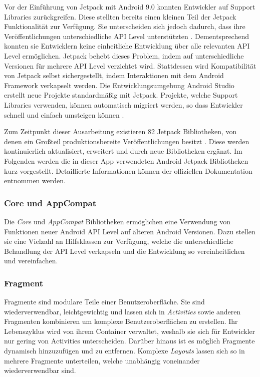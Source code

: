 \documentclass[a4paper, 11pt]{article}
\begin{document}
Vor der Einführung von Jetpack mit Android 9.0 konnten Entwickler auf Support Libraries zurückgreifen.
Diese stellten bereits einen kleinen Teil der Jetpack Funktionalität zur Verfügung.
Sie unterscheiden sich jedoch dadurch, dass ihre Veröffentlichungen unterschiedliche API Level unterstützten \autocite{supportlibrariesversions}.
Dementsprechend konnten sie Entwicklern keine einheitliche Entwicklung über alle relevanten API Level ermöglichen.
Jetpack behebt dieses Problem, indem auf unterschiedliche Versionen für mehrere API Level verzichtet wird.
Stattdessen wird Kompatibilität von Jetpack selbst sichergestellt, indem Interaktionen mit dem Android Framework verkapselt werden.
Die Entwicklungsumgebung Android Studio erstellt neue Projekte standardmäßig mit Jetpack.
Projekte, welche Support Libraries verwenden, können automatisch migriert werden, so dass Entwickler schnell und einfach umsteigen können \autocite{androidxmigration}.

Zum Zeitpunkt dieser Ausarbeitung existieren 82 Jetpack Bibliotheken, von denen ein Großteil produktionsbereite Veröffentlichungen besitzt \autocite{jetpackcount}.
Diese werden kontinuierlich aktualisiert, erweitert und durch neue Bibliotheken ergänzt.
Im Folgenden werden die in dieser App verwendeten Android Jetpack Bibliotheken kurz vorgestellt. Detaillierte Informationen können der offiziellen Dokumentation entnommen werden.

\subsubsection{Core und AppCompat}
\label{subsubsec:app:jetpack:base}
Die \textit{Core} und \textit{AppCompat} Bibliotheken ermöglichen eine Verwendung von Funktionen neuer Android API Level auf älteren Android Versionen.
Dazu stellen sie eine Vielzahl an Hilfsklassen zur Verfügung, welche die unterschiedliche Behandlung der API Level verkapseln und die Entwicklung so vereinheitlichen und vereinfachen.

\subsubsection{Fragment}
\label{subsubsec:app:jetpack:fragment}
Fragmente sind modulare Teile einer Benutzeroberfläche.
Sie sind wiederverwendbar, leichtgewichtig und lassen sich in \textit{Activities} sowie anderen Fragmenten kombinieren um komplexe Benutzeroberflächen zu erstellen.
Ihr Lebenszyklus wird von ihrem Container verwaltet, weshalb sie sich für Entwickler nur gering von Activities unterscheiden.
Darüber hinaus ist es möglich Fragmente dynamisch hinzuzufügen und zu entfernen.
Komplexe \textit{Layouts} lassen sich so in mehrere Fragmente unterteilen, welche unabhängig voneinander wiederverwendbar sind.
\end{document}
